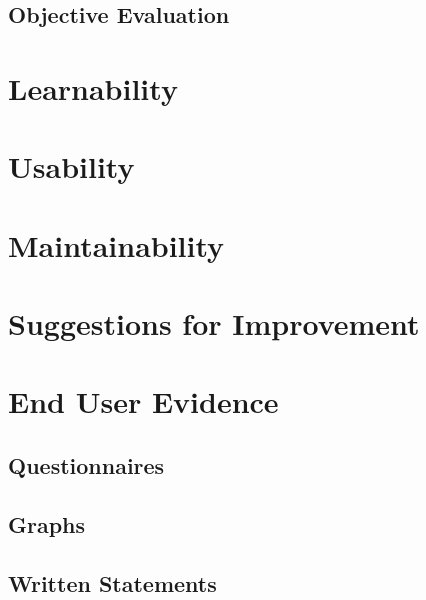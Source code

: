 \subsection{Objective Evaluation}

\section{Learnability}

\section{Usability}

\section{Maintainability}

\section{Suggestions for Improvement}

\section{End User Evidence}

\subsection{Questionnaires}

\subsection{Graphs}

\subsection{Written Statements}
